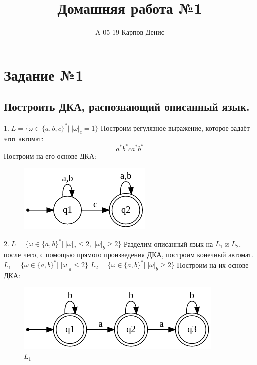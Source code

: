 \documentclass[a4paper,12pt]{article}
\title{Домашняя работа №1}
\author{A-05-19 Карпов Денис}
\date{}
\begin{document}
\maketitle

\section*{\Huge Задание №1}

\subsection*{Построить ДКА, распознающий описанный язык.}

\Large $1.\;L = {\{\omega \in \{a,b,c\}^*|\;|\omega|_c = 1\}}$\newline
Построим регулязное выражение, которое задаёт этот автомат:\newline
\Large$$a^*b^*ca^*b^*$$\newline
Построим на его основе ДКА:\newline
\begin{figure}[h]
\centering
\includegraphics[scale=0.75]{1_1}
\end{figure}

\Large $2.\;L = {\{\omega \in \{a,b\}^*|\;|\omega|_a \le 2,\;|\omega|_b \ge 2\}}$\newline
Разделим описанный язык на $L_1$ и $L_2$, после чего, с помощью прямого произведения ДКА, построим конечный автомат.\newline
\Large $L_1 = {\{\omega \in \{a,b\}^*|\;|\omega|_a \le 2\}}$\newline
\Large $L_2 = {\{\omega \in \{a,b\}^*|\;|\omega|_b \ge 2\}}$\newline
Построим на их основе ДКА:\newline
\begin{figure}[h]
\centering
\includegraphics[scale=0.75]{1_2_1}
\caption{$L_1$}
\end{figure}
\end{document}
